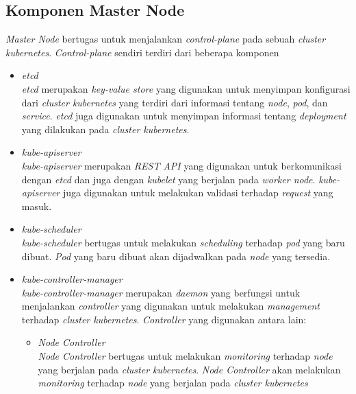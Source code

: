 \subsection{Komponen Master Node} \label{subsec:Komponen Master Node}
\textit{Master Node} bertugas untuk menjalankan \textit{control-plane} pada sebuah \textit{cluster kubernetes}.
\textit{Control-plane} sendiri terdiri dari beberapa komponen
\begin{itemize}
    \item \textit{etcd} \\
          \textit{etcd} merupakan \textit{key-value store} yang digunakan untuk menyimpan konfigurasi
          dari \textit{cluster kubernetes} yang terdiri dari informasi tentang \textit{node}, \textit{pod}, dan \textit{service}.
          \textit{etcd} juga digunakan untuk menyimpan informasi tentang \textit{deployment} yang dilakukan pada \textit{cluster kubernetes}.
    \item \textit{kube-apiserver} \\
          \textit{kube-apiserver} merupakan \textit{REST API} yang digunakan untuk berkomunikasi dengan \textit{etcd}
          dan juga dengan \textit{kubelet} yang berjalan pada \textit{worker node}.
          \textit{kube-apiserver} juga digunakan untuk melakukan validasi terhadap \textit{request} yang masuk.
    \item \textit{kube-scheduler} \\
          \textit{kube-scheduler} bertugas untuk melakukan \textit{scheduling} terhadap \textit{pod} yang baru dibuat.
          \textit{Pod} yang baru dibuat akan dijadwalkan pada \textit{node} yang tersedia.
    \item \textit{kube-controller-manager} \\
          \textit{kube-controller-manager} merupakan \textit{daemon} yang berfungsi untuk menjalankan \textit{controller}
          yang digunakan untuk melakukan \textit{management} terhadap \textit{cluster kubernetes}.
          \textit{Controller} yang digunakan antara lain:
          \begin{itemize}
              \item \textit{Node Controller} \\
                    \textit{Node Controller} bertugas untuk melakukan \textit{monitoring} terhadap \textit{node} yang berjalan pada \textit{cluster kubernetes}.
                    \textit{Node Controller} akan melakukan \textit{monitoring} terhadap \textit{node} yang berjalan pada \textit{cluster kubernetes}

\end{itemize}
\end{itemize}

